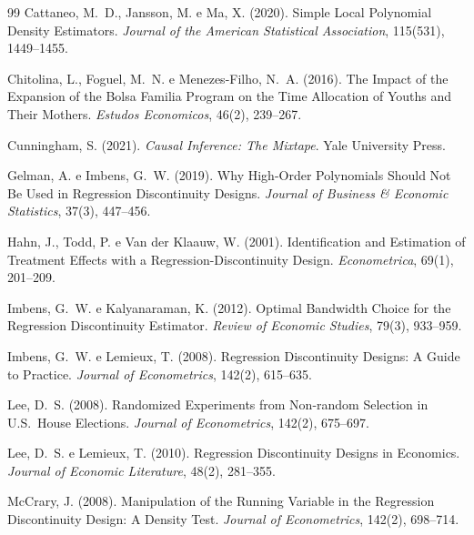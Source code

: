 \documentclass[12pt, a4paper, openany]{book}
\begin{document}
\begin{thebibliography}{99}
Cattaneo, M.~D., Jansson, M. e Ma, X. (2020).
\newblock Simple Local Polynomial Density Estimators.
\newblock \textit{Journal of the American Statistical Association}, 115(531), 1449--1455.

Chitolina, L., Foguel, M.~N. e Menezes-Filho, N.~A. (2016).
\newblock The Impact of the Expansion of the Bolsa Familia Program on the Time Allocation of Youths and Their Mothers.
\newblock \textit{Estudos Economicos}, 46(2), 239--267.

Cunningham, S. (2021).
\newblock \textit{Causal Inference: The Mixtape}.
\newblock Yale University Press.

Gelman, A. e Imbens, G.~W. (2019).
\newblock Why High-Order Polynomials Should Not Be Used in Regression Discontinuity Designs.
\newblock \textit{Journal of Business \& Economic Statistics}, 37(3), 447--456.

Hahn, J., Todd, P. e Van der Klaauw, W. (2001).
\newblock Identification and Estimation of Treatment Effects with a Regression-Discontinuity Design.
\newblock \textit{Econometrica}, 69(1), 201--209.

Imbens, G.~W. e Kalyanaraman, K. (2012).
\newblock Optimal Bandwidth Choice for the Regression Discontinuity Estimator.
\newblock \textit{Review of Economic Studies}, 79(3), 933--959.

Imbens, G.~W. e Lemieux, T. (2008).
\newblock Regression Discontinuity Designs: A Guide to Practice.
\newblock \textit{Journal of Econometrics}, 142(2), 615--635.

Lee, D.~S. (2008).
\newblock Randomized Experiments from Non-random Selection in U.S.\ House Elections.
\newblock \textit{Journal of Econometrics}, 142(2), 675--697.

Lee, D.~S. e Lemieux, T. (2010).
\newblock Regression Discontinuity Designs in Economics.
\newblock \textit{Journal of Economic Literature}, 48(2), 281--355.

McCrary, J. (2008).
\newblock Manipulation of the Running Variable in the Regression Discontinuity Design: A Density Test.
\newblock \textit{Journal of Econometrics}, 142(2), 698--714.


\end{thebibliography}
\end{document}
